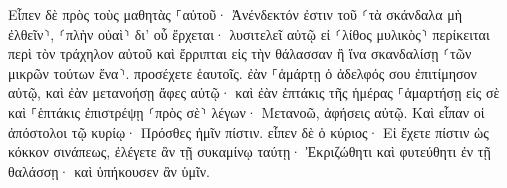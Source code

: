 \documentclass{openreader}
\begin{document}
Εἶπεν δὲ πρὸς τοὺς μαθητὰς ⸀αὐτοῦ· Ἀνένδεκτόν ἐστιν τοῦ ⸂τὰ σκάνδαλα μὴ ἐλθεῖν⸃, ⸂πλὴν οὐαὶ⸃ δι’ οὗ ἔρχεται· 
λυσιτελεῖ αὐτῷ εἰ ⸂λίθος μυλικὸς⸃ περίκειται περὶ τὸν τράχηλον αὐτοῦ καὶ ἔρριπται εἰς τὴν θάλασσαν ἢ ἵνα σκανδαλίσῃ ⸂τῶν μικρῶν τούτων ἕνα⸃. 
προσέχετε ἑαυτοῖς. ἐὰν ⸀ἁμάρτῃ ὁ ἀδελφός σου ἐπιτίμησον αὐτῷ, καὶ ἐὰν μετανοήσῃ ἄφες αὐτῷ· 
καὶ ἐὰν ἑπτάκις τῆς ἡμέρας ⸀ἁμαρτήσῃ εἰς σὲ καὶ ⸀ἑπτάκις ἐπιστρέψῃ ⸂πρὸς σὲ⸃ λέγων· Μετανοῶ, ἀφήσεις αὐτῷ. 
Καὶ εἶπαν οἱ ἀπόστολοι τῷ κυρίῳ· Πρόσθες ἡμῖν πίστιν. 
εἶπεν δὲ ὁ κύριος· Εἰ ἔχετε πίστιν ὡς κόκκον σινάπεως, ἐλέγετε ἂν τῇ συκαμίνῳ ταύτῃ· Ἐκριζώθητι καὶ φυτεύθητι ἐν τῇ θαλάσσῃ· καὶ ὑπήκουσεν ἂν ὑμῖν. 
\end{document}
